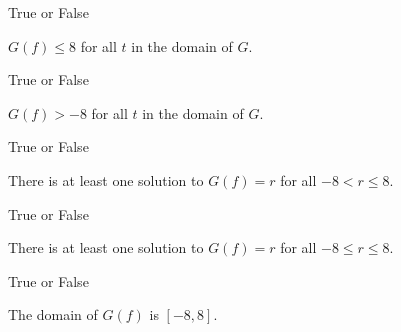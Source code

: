 \documentclass{ximera}
\begin{document}
\begin{exercise}
\begin{question} True or False

$G(f) \leq 8$ for all $t$ in the domain of $G$.

\begin{multipleChoice}
\end{multipleChoice}
\end{question}








\begin{question} True or False

$G(f) > -8$ for all $t$ in the domain of $G$.

\begin{multipleChoice}
\end{multipleChoice}
\end{question}






\begin{question} True or False

There is at least one solution to $G(f) = r$ for all $-8 < r \leq 8$.

\begin{multipleChoice}
\end{multipleChoice}
\end{question}






\begin{question} True or False

There is at least one solution to $G(f) = r$ for all $-8 \leq r \leq 8$.

\begin{multipleChoice}
\end{multipleChoice}
\end{question}





\begin{question} True or False

The domain of $G(f)$ is $[-8, 8]$.

\begin{multipleChoice}
\end{multipleChoice}
\end{question}







\end{exercise}
\end{document}
